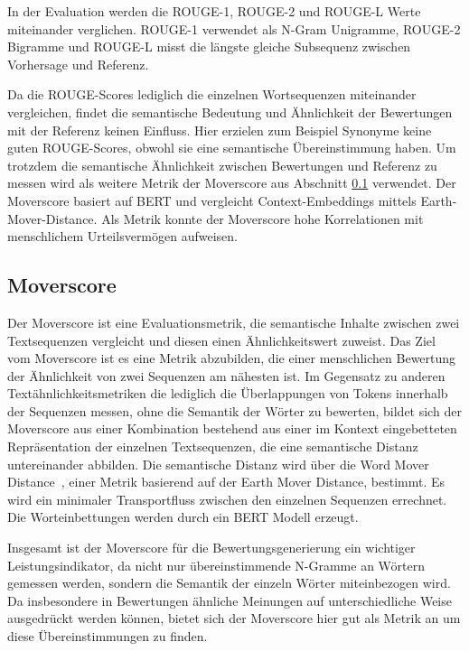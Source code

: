 In der Evaluation werden die ROUGE-1, ROUGE-2 und ROUGE-L Werte miteinander verglichen.
ROUGE-1 verwendet als N-Gram Unigramme, ROUGE-2 Bigramme und ROUGE-L misst die längste gleiche Subsequenz zwischen Vorhersage und Referenz.

Da die ROUGE-Scores lediglich die einzelnen Wortsequenzen miteinander vergleichen, findet die semantische Bedeutung und Ähnlichkeit der Bewertungen mit der Referenz keinen Einfluss.
Hier erzielen zum Beispiel Synonyme keine guten ROUGE-Scores, obwohl sie eine semantische Übereinstimmung haben.
Um trotzdem die semantische Ähnlichkeit zwischen Bewertungen und Referenz zu messen wird als weitere Metrik der Moverscore aus Abschnitt \ref{moverscore} verwendet.
Der Moverscore basiert auf BERT und vergleicht Context-Embeddings mittels Earth-Mover-Distance. Als Metrik konnte der Moverscore hohe Korrelationen mit menschlichem Urteilsvermögen aufweisen.


\subsection{Moverscore}
\label{moverscore}
Der Moverscore \citep{moverscore_paper} ist eine Evaluationsmetrik, die semantische Inhalte zwischen zwei Textsequenzen vergleicht und diesen einen Ähnlichkeitswert zuweist.
Das Ziel vom Moverscore ist es eine Metrik abzubilden, die einer menschlichen Bewertung der Ähnlichkeit von zwei Sequenzen am nähesten ist. 
Im Gegensatz zu anderen Textähnlichkeitsmetriken die lediglich die Überlappungen von Tokens innerhalb der Sequenzen messen, ohne die Semantik der Wörter zu bewerten, 
bildet sich der Moverscore aus einer Kombination bestehend aus einer im Kontext eingebetteten Repräsentation der einzelnen Textsequenzen, die eine semantische Distanz untereinander abbilden.
Die semantische Distanz wird über die Word Mover Distance \citep{wordmoverdistance}, einer Metrik basierend auf der Earth Mover Distance, bestimmt. Es wird ein minimaler Transportfluss zwischen den einzelnen Sequenzen errechnet.
Die Worteinbettungen werden durch ein BERT Modell erzeugt.

Insgesamt ist der Moverscore für die Bewertungsgenerierung ein wichtiger Leistungsindikator, da nicht nur übereinstimmende N-Gramme an Wörtern gemessen werden, sondern die Semantik der einzeln Wörter miteinbezogen wird. 
Da insbesondere in Bewertungen ähnliche Meinungen auf unterschiedliche Weise ausgedrückt werden können, bietet sich der Moverscore hier gut als Metrik an um diese Übereinstimmungen zu finden.


